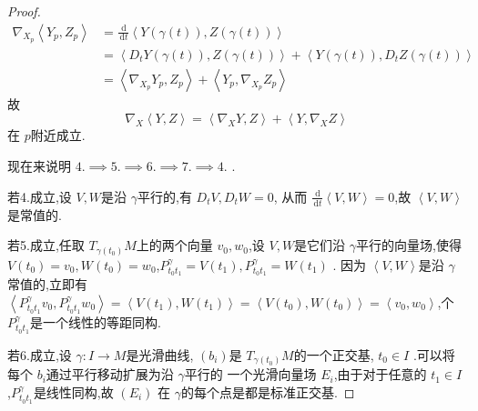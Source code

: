 \documentclass[../../几何与拓扑.tex]{subfiles}
\begin{document}
\begin{proof}
\[    \begin{aligned}
    \nabla _{X_{p}}\left<Y_{p},Z_{p} \right>& =   \frac{\,\mathrm{d}  }{\,\mathrm{d} t }\left<Y\left(  \gamma \left( t \right)  \right),Z\left(  \gamma \left( t \right)  \right)   \right>\\ 
     &=  \left<D_{t}Y\left(  \gamma \left( t \right)  \right) ,Z\left(  \gamma \left( t \right)  \right)  \right>+ \left<Y\left(  \gamma \left( t \right)  \right) ,D_{t}Z\left(  \gamma \left( t \right)  \right)  \right>  \\ 
      & =  \left< \nabla _{X_{p}}Y_{p},Z_{p} \right>+ \left<Y_{p}, \nabla _{X_{p}}Z_{p} \right> 
    \end{aligned}
    \]故 \[
     \nabla _{X}\left<Y,Z \right>= \left< \nabla _{X}Y,Z \right>+ \left<Y, \nabla _{X}Z \right>
    \]在 \(  p  \)附近成立. 

    现在来说明 \(  4.\implies 5. \implies 6. \implies 7.\implies  4.  \) .
    
    若4.成立,设 \(  V,W  \)是沿 \(   \gamma   \)平行的,有 \(  D_{t}V,D_{t}W= 0  \),
    从而 \(  \frac{\,\mathrm{d}  }{\,\mathrm{d} t }\left<V,W \right>= 0   \),故 \(  \left<V,W \right>  \)     是常值的.

    若5.成立,任取 \(  T_{ \gamma \left( t_0 \right) }M  \)上的两个向量 \(  v_0,w_0  \),设 \(  V,W  \)是它们沿 \(   \gamma   \)平行的向量场,使得 \(  V\left( t_0 \right)= v_0,W\left( t_0 \right)= w_0    \),\(  P_{t_0t_1}^{ \gamma }= V\left( t_1 \right),P_{t_0t_1}^{ \gamma }= W\left( t_1 \right)    \)  .    因为 \(  \left<V,W \right>  \)是沿 \(   \gamma   \)常值的,立即有 \(  \left<P_{t_0t_1}^{ \gamma }v_0,P_{t_0t_1}^{ \gamma }w_0 \right>= \left<V\left( t_1 \right),W\left( t_1 \right)   \right>= \left<V\left( t_0 \right),W\left( t_0 \right)   \right>=  \left<v_0,w_0 \right>  \),个 \(  P_{t_0t_1}^{ \gamma }  \)是一个线性的等距同构.    

    若6.成立,设 \(   \gamma :I\to M  \)是光滑曲线, \(  \left( b_{i} \right)   \)是 \(  T_{ \gamma \left( t_0 \right) }M  \)的一个正交基, \(  t_0 \in I  \) .可以将每个 \(  b_{i}  \)通过平行移动扩展为沿 \(   \gamma   \)平行的 一个光滑向量场 \(  E_{i}  \),由于对于任意的 \(  t_1\in I  \) ,\(  P_{t_0t_1}^{ \gamma }  \)是线性同构,故 \(  \left( E_{i} \right)   \)  在 \(   \gamma   \)的每个点是都是标准正交基. 


\end{proof}
\end{document}
